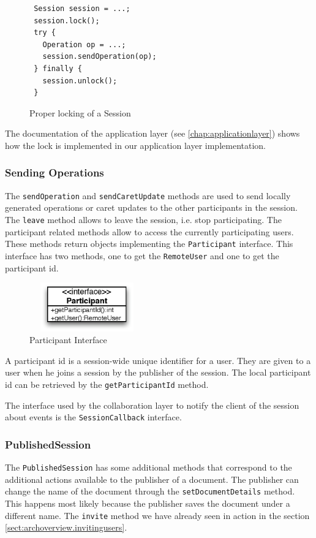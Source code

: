 \begin{figure}[H]
 \centering
 \small{\begin{verbatim}
 Session session = ...;
 session.lock();
 try {
   Operation op = ...;
   session.sendOperation(op);
 } finally {
   session.unlock();
 }
 \end{verbatim}}
 \caption{Proper locking of a Session}
\end{figure}

The documentation of the application layer (see \ref{chap:applicationlayer}) 
shows how the lock is implemented in our application layer implementation.


\subsubsection{Sending Operations}
The \texttt{sendOperation} and \texttt{sendCaretUpdate} methods are used to send 
locally generated operations or
caret updates to the other participants in the session. The \texttt{leave}
method allows to leave the session, i.e. stop participating. The participant
related methods allow to access the currently participating users. These
methods return objects implementing the \texttt{Participant} interface. This
interface has
two methods, one to get the \texttt{RemoteUser} and one to get the participant
id.

\begin{figure}[H]
 \centering
 \includegraphics[width=4.97cm,height=2.1cm]{../images/finalreport/architecture_participant_uml.eps}
 \caption{Participant Interface}
\end{figure}

A participant id is a session-wide unique identifier for a user. They are given
to a user when he joins a session by the publisher of the session. The local
participant id can be retrieved by the \texttt{getParticipantId} method.

The interface used by the collaboration layer to notify the client of the
session about events is the \texttt{SessionCallback} interface.


\subsubsection{PublishedSession}
The \texttt{PublishedSession} has some additional methods that correspond
to the additional actions available to the publisher of a document. The
publisher can change the name of the document through the
\texttt{setDocumentDetails} method. This happens most likely because the
publisher saves the document under a different name.
The \texttt{invite} method we have already seen in action in the section
\ref{sect:archoverview.invitingusers}.

